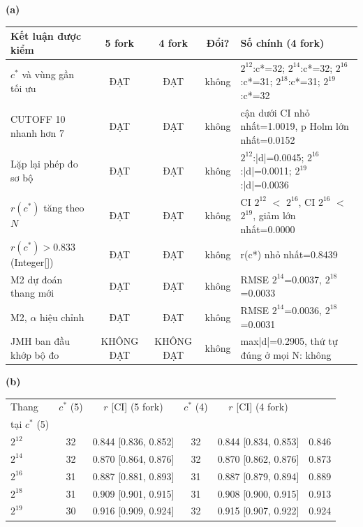 \textbf{(a)}\par\smallskip
\begin{tabularx}{\linewidth}{lcccX}
\toprule
Kết luận được kiểm & 5 fork & 4 fork & Đổi? & Số chính (4 fork) \\
\midrule
$c^*$ và vùng gần tối ưu & ĐẠT & ĐẠT & không & $2^{12}$:c*=32; $2^{14}$:c*=32; $2^{16}$:c*=31; $2^{18}$:c*=31; $2^{19}$:c*=32 \\
CUTOFF 10 nhanh hơn 7 & ĐẠT & ĐẠT & không & cận dưới CI nhỏ nhất=1.0019, p Holm lớn nhất=0.0152 \\
Lặp lại phép đo sơ bộ & ĐẠT & ĐẠT & không & $2^{12}$:|d|=0.0045; $2^{16}$:|d|=0.0011; $2^{19}$:|d|=0.0036 \\
$r(c^*)$ tăng theo $N$ & ĐẠT & ĐẠT & không & CI $2^{12}$ $<$ $2^{16}$, CI $2^{16}$ $<$ $2^{19}$, giảm lớn nhất=0.0000 \\
$r(c^*) > 0.833$ (Integer[]) & ĐẠT & ĐẠT & không & r(c*) nhỏ nhất=0.8439 \\
M2 dự đoán thang mới & ĐẠT & ĐẠT & không & RMSE $2^{14}$=0.0037, $2^{18}$=0.0033 \\
M2, $\alpha$ hiệu chỉnh & ĐẠT & ĐẠT & không & RMSE $2^{14}$=0.0036, $2^{18}$=0.0031 \\
JMH ban đầu khớp bộ đo & KHÔNG ĐẠT & KHÔNG ĐẠT & không & max|d|=0.2905, thứ tự đúng ở mọi N: không \\
\bottomrule
\end{tabularx}
\bigskip

\textbf{(b)}\par\smallskip
\begin{tabular}{lccccc}
\toprule
Thang & $c^*$ (5) & $r$ [CI] (5 fork) & $c^*$ (4) & $r$ [CI] (4 fork) & \makecell{{$r$ fork 4} \\ {tại $c^*$ (5)}} \\
\midrule
$2^{12}$ & 32 & 0.844 [0.836, 0.852] & 32 & 0.844 [0.834, 0.853] & 0.846 \\
$2^{14}$ & 32 & 0.870 [0.864, 0.876] & 32 & 0.870 [0.862, 0.876] & 0.873 \\
$2^{16}$ & 31 & 0.887 [0.881, 0.893] & 31 & 0.887 [0.879, 0.894] & 0.889 \\
$2^{18}$ & 31 & 0.909 [0.901, 0.915] & 31 & 0.908 [0.900, 0.915] & 0.913 \\
$2^{19}$ & 30 & 0.916 [0.909, 0.924] & 32 & 0.915 [0.907, 0.922] & 0.924 \\
\bottomrule
\end{tabular}
